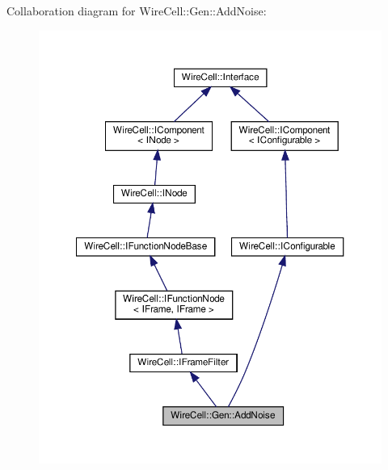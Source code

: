 Collaboration diagram for Wire\+Cell\+:\+:Gen\+:\+:Add\+Noise\+:
\nopagebreak
\begin{figure}[H]
\begin{center}
\leavevmode
\includegraphics[width=350pt]{class_wire_cell_1_1_gen_1_1_add_noise__coll__graph}
\end{center}
\end{figure}
